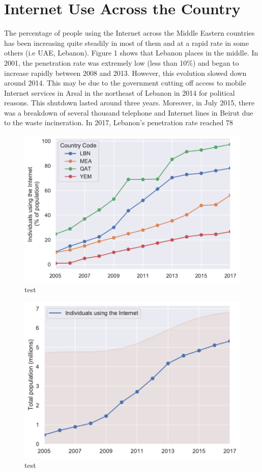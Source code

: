 \documentclass[a4paper,titlepage]{article}
\begin{document}
\section{Internet Use Across the Country}
The percentage of people using the Internet across the Middle Eastern countries has been increasing quite steadily in most of them and at a rapid rate in some others (i.e UAE, Lebanon). Figure 1 shows that Lebanon places in the middle.
In 2001, the penetration rate was extremely low (less than 10\%) and began to increase rapidly between 2008 and 2013. However, this evolution slowed down around 2014. This may be due to the government cutting off access to mobile Internet services in Arsal in the northeast of Lebanon in 2014 for political reasons. This shutdown lasted around three years. Moreover, in July 2015, there was a breakdown of several thousand telephone and Internet lines in Beirut due to the waste incineration.
In 2017, Lebanon’s penetration rate reached 78%

\begin{figure}
    \centering
    \includegraphics[width=0.75\linewidth]{../output/internet-users.pdf}
    \caption{test}
\end{figure}

\begin{figure}
    \centering
    \includegraphics[width=0.75\linewidth]{../output/population-internet-lbn.pdf}
    \caption{test}
\end{figure}
\end{document}
